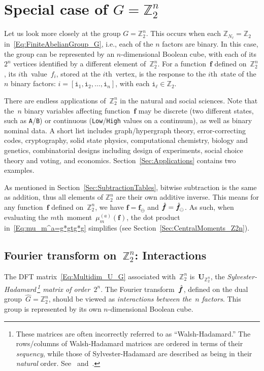 \documentclass[letterpaper,11pt]{article}
\newcommand{\bs}[1]{{\boldsymbol{#1}}}
\newcommand{\gr}[1]{( #1 )}
\newcommand{\vect}[1]{[ #1 ]}
\newcommand{\Int}{\mathbb Z}
\newcommand{\dimin}[2]{{ #1 }^{\gr{#2}}}
\newcommand{\bcode}[1]{\texttt{#1}}
\newcommand{\hatbsf}{{\kern+0.25em}\hat{{\kern-0.25em}\bs{f}}}
\newcommand{\ith}{$i$th}
\newcommand{\mth}{$m$th}
\theoremstyle{definition} \newtheorem{remark}{Remark}
\begin{document}
\section{Special case of $G=\Int_2^n$} \label{Sec:SpecialCase_Z2n}
Let us look more closely at the group $G=\Int_2^n$. This occurs when each $\Int_{N_\ell} = \Int_2$ in~\eqref{Eq:FiniteAbelianGroup_G}, i.e., each of the $n$ factors are binary. In this case, the group can be represented by an $n$-dimensional Boolean cube, with each of its $2^n$ vertices identified by a different element of~$\Int_2^n$. For a function~$\bs{f}$ defined on~$\Int_2^n$, its \ith\ value~$f_i$, stored at the \ith\ vertex, is the response to the \ith\ state of the~$n$ binary factors: $i=\vect{\bcode{i}_1, \bcode{i}_2, \ldots, \bcode{i}_n}$, with each $\bcode{i}_\ell\in\Int_2$.

There are endless applications of~$\Int_2^n$ in the natural and social sciences. Note that the~$n$ binary variables affecting function~$\bs{f}$ may be discrete (two different states, such as \bcode{A}/\bcode{B}) or continuous (\bcode{Low}/\bcode{High} values on a continuum), as well as binary nominal data. A short list includes graph/hypergraph theory, error-correcting codes, cryptography, solid state physics, computational chemistry, biology and genetics, combinatorial designs including design of experiments, social choice theory and voting, and economics. Section~\ref{Sec:Applications} contains two examples.

As mentioned in Section~\ref{Sec:SubtractionTables}, bitwise subtraction is the same as addition, thus all elements of $\Int_2^n$ are their own additive inverse. This means for any function~$\bs{f}$ defined on~$\Int_2^n$, we have $\bs{f} = \bs{f}_{\!\ominus}$ and $\hatbsf = {\hatbsf}_{\!\ominus}$. As such, when evaluating the \mth\ moment~$\dimin{\mu}{a}_m\gr{\bs{f}}$, the dot product in~\eqref{Eq:mu_m^a=g*gtg*g} simplifies (see Section~\ref{Sec:CentralMoments_Z2n}).


\subsection{Fourier transform on~$\Int_2^n$: Interactions}
The DFT matrix~\eqref{Eq:Multidim_U_G} associated with~$\Int_2^n$ is~$\bs{U}_{\Int_2^n}$, the \emph{Sylvester-Hadamard\,\footnote{These matrices are often incorrectly referred to as ``Walsh-Hadamard.'' The rows/columns of Walsh-Hadamard matrices are ordered in terms of their \emph{sequency}, while those of Sylvester-Hadamard are described as being in their \emph{natural} order. See~\cite[Def.~2.3, Eq.~(3.7)]{Horadam_HadamardMatrices} and~\cite[Footnote~5]{doro2021fourierTransQuantTraitCS}.} matrix of order~$2^n$}. The Fourier transform~$\hatbsf$, defined on the dual group~$\widehat{G}=\Int_2^n$, should be viewed as \emph{interactions between the~$n$ factors}. This group is represented by its own $n$-dimensional Boolean cube.
\end{document}
